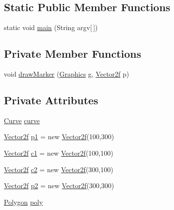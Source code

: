 \subsection*{Static Public Member Functions}
\begin{DoxyCompactItemize}
\item 
static void \mbox{\hyperlink{classorg_1_1newdawn_1_1slick_1_1tests_1_1_curve_test_a4fec7d571780567c79254a2240094488}{main}} (String argv\mbox{[}$\,$\mbox{]})
\end{DoxyCompactItemize}
\subsection*{Private Member Functions}
\begin{DoxyCompactItemize}
\item 
void \mbox{\hyperlink{classorg_1_1newdawn_1_1slick_1_1tests_1_1_curve_test_a51cc105c8dc8ab291da8266c4546daef}{draw\+Marker}} (\mbox{\hyperlink{classorg_1_1newdawn_1_1slick_1_1_graphics}{Graphics}} g, \mbox{\hyperlink{classorg_1_1newdawn_1_1slick_1_1geom_1_1_vector2f}{Vector2f}} p)
\end{DoxyCompactItemize}
\subsection*{Private Attributes}
\begin{DoxyCompactItemize}
\item 
\mbox{\hyperlink{classorg_1_1newdawn_1_1slick_1_1geom_1_1_curve}{Curve}} \mbox{\hyperlink{classorg_1_1newdawn_1_1slick_1_1tests_1_1_curve_test_a11a162afea2a3301bbf026530a35cb1f}{curve}}
\item 
\mbox{\hyperlink{classorg_1_1newdawn_1_1slick_1_1geom_1_1_vector2f}{Vector2f}} \mbox{\hyperlink{classorg_1_1newdawn_1_1slick_1_1tests_1_1_curve_test_a501dde8920de8a3acf3a9d0496c95dff}{p1}} = new \mbox{\hyperlink{classorg_1_1newdawn_1_1slick_1_1geom_1_1_vector2f}{Vector2f}}(100,300)
\item 
\mbox{\hyperlink{classorg_1_1newdawn_1_1slick_1_1geom_1_1_vector2f}{Vector2f}} \mbox{\hyperlink{classorg_1_1newdawn_1_1slick_1_1tests_1_1_curve_test_a4ea333582d5d1c44c78ab9eb486fbb7f}{c1}} = new \mbox{\hyperlink{classorg_1_1newdawn_1_1slick_1_1geom_1_1_vector2f}{Vector2f}}(100,100)
\item 
\mbox{\hyperlink{classorg_1_1newdawn_1_1slick_1_1geom_1_1_vector2f}{Vector2f}} \mbox{\hyperlink{classorg_1_1newdawn_1_1slick_1_1tests_1_1_curve_test_a799c4eb15b4f69dd87fd4fdc43b41520}{c2}} = new \mbox{\hyperlink{classorg_1_1newdawn_1_1slick_1_1geom_1_1_vector2f}{Vector2f}}(300,100)
\item 
\mbox{\hyperlink{classorg_1_1newdawn_1_1slick_1_1geom_1_1_vector2f}{Vector2f}} \mbox{\hyperlink{classorg_1_1newdawn_1_1slick_1_1tests_1_1_curve_test_a47071a94010461656bc85d33d381bc42}{p2}} = new \mbox{\hyperlink{classorg_1_1newdawn_1_1slick_1_1geom_1_1_vector2f}{Vector2f}}(300,300)
\item 
\mbox{\hyperlink{classorg_1_1newdawn_1_1slick_1_1geom_1_1_polygon}{Polygon}} \mbox{\hyperlink{classorg_1_1newdawn_1_1slick_1_1tests_1_1_curve_test_ada9f2cceffa99d343192da65bc17df7d}{poly}}
\end{DoxyCompactItemize}
